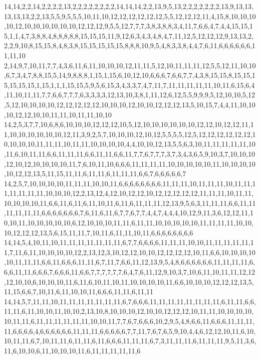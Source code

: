 14,14,2,2,14,2,2,2,2,13,2,2,2,2,2,2,2,2,14,14,14,2,2,13,9,5,13,2,2,2,2,2,2,2,13,9,13,13,13,13,13,2,2,13,5,5,9,5,5,5,10,11,10,12,12,12,12,12,12,5,5,12,12,12,11,4,15,8,10,10,10,10,12,10,10,10,10,10,10,12,12,12,9,5,5,12,7,7,7,3,8,3,8,8,3,4,11,7,6,6,4,7,4,4,15,15,15,1,1,4,7,3,8,8,4,8,8,8,8,8,15,15,15,11,9,12,6,3,4,3,4,8,4,7,11,12,5,12,12,12,9,13,13,2,2,2,9,10,8,15,15,8,4,8,3,8,15,15,15,15,15,8,8,8,10,9,5,4,8,3,3,8,4,4,7,6,11,6,6,6,6,6,6,11,11,10
2,14,9,7,10,11,7,7,4,3,6,11,6,11,10,10,10,12,11,11,5,12,10,11,11,11,12,5,5,12,11,10,10,6,7,3,4,7,8,8,15,5,14,9,8,8,8,1,15,1,15,6,10,12,10,6,6,6,7,6,6,7,7,4,3,8,15,15,8,15,15,15,15,15,15,1,15,1,1,1,15,15,5,9,5,6,15,3,4,3,3,7,4,7,11,7,11,11,11,11,11,10,11,6,15,6,4,11,10,11,11,7,7,6,6,7,7,7,6,3,3,3,3,12,13,10,3,8,1,11,12,6,12,5,5,9,9,9,5,12,10,10,5,12,5,12,10,10,10,10,12,12,12,12,12,10,10,10,12,10,10,12,12,12,13,5,10,15,7,4,4,11,10,10,10,12,12,10,10,11,11,10,11,11,10,10
14,2,5,3,7,7,10,6,8,6,10,10,10,12,12,12,10,5,12,10,10,10,10,10,10,12,12,10,12,12,11,11,10,10,10,10,10,10,12,11,3,9,2,5,7,10,10,10,12,10,12,5,5,5,5,12,5,12,12,12,12,12,12,10,10,10,10,11,11,11,10,11,11,10,10,10,10,4,4,10,10,12,13,5,5,6,3,10,11,11,11,11,11,10,11,6,10,11,11,6,6,11,11,11,6,6,11,11,6,6,11,7,7,6,7,7,7,3,7,3,4,3,6,5,9,10,3,7,10,10,10,12,10,12,10,10,10,10,11,7,6,10,11,10,6,6,6,11,11,11,11,10,10,10,10,10,11,10,10,10,10,10,12,12,13,5,11,15,11,11,6,11,11,6,11,11,11,6,6,7,6,6,6,6,6,7
14,2,5,7,10,10,10,10,11,11,11,10,10,11,6,6,6,6,6,6,6,6,11,11,11,10,11,11,11,10,11,11,11,11,11,11,11,10,10,10,12,2,13,12,4,12,10,12,12,10,12,12,12,12,12,11,11,11,10,11,11,10,10,10,10,11,6,6,11,6,11,6,11,10,11,6,11,6,11,11,11,12,13,9,5,6,3,11,11,11,6,6,11,11,11,11,11,11,6,6,6,6,6,6,6,7,6,11,6,11,6,7,7,6,7,7,4,4,7,4,4,4,10,12,9,11,3,6,12,12,11,10,10,11,10,10,10,10,10,6,12,10,10,10,11,11,6,11,11,10,10,10,10,10,11,11,11,11,10,10,10,12,12,12,13,5,6,15,11,11,7,10,11,6,11,11,10,11,6,6,6,6,6,6,6,6
14,14,5,4,10,11,10,11,11,11,11,11,11,11,6,7,7,6,6,6,6,11,11,11,10,10,11,11,11,11,11,11,7,11,6,11,10,10,10,10,12,2,13,12,3,10,12,12,10,10,12,12,12,12,10,11,6,6,10,10,10,10,10,11,11,11,6,6,11,6,6,6,11,11,6,7,11,7,6,6,11,12,13,9,5,4,8,6,6,6,6,6,6,11,11,11,11,6,6,6,11,11,6,6,6,7,6,6,6,11,6,6,7,7,7,7,7,7,6,4,7,6,11,12,9,10,3,7,10,6,11,10,11,11,12,12,12,10,10,6,10,10,10,11,6,11,6,10,11,10,11,10,10,10,10,11,6,6,10,10,10,12,12,12,13,5,11,15,6,6,7,10,11,6,11,10,10,11,6,6,6,11,11,6,11,11
14,14,5,7,11,11,10,11,11,11,11,11,11,11,6,7,6,6,6,11,11,11,11,11,11,11,11,6,11,11,6,6,11,11,6,11,10,10,11,10,10,2,13,10,8,10,10,10,12,10,10,12,12,12,10,11,11,10,10,10,10,10,11,11,6,11,11,11,11,11,11,10,10,11,7,7,6,7,6,6,6,10,2,9,5,4,8,6,6,11,6,6,6,11,11,11,11,6,6,6,6,4,6,6,6,6,6,6,11,11,11,6,6,6,6,6,7,7,11,7,6,7,6,5,9,10,4,4,6,12,12,10,11,6,10,10,11,11,6,7,10,11,11,6,11,11,6,11,6,6,6,11,11,11,6,7,3,11,11,11,6,11,11,11,9,5,11,3,6,11,6,10,10,6,11,10,10,10,11,6,11,11,11,11,11,6
